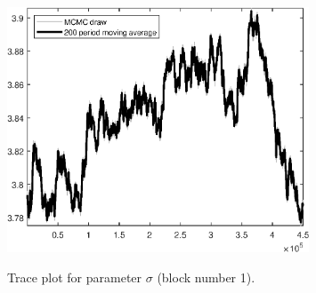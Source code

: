 \begin{figure}[H]
\centering
  \includegraphics[width=0.8\textwidth]{BRS_sectoral_wo_demand_shocks/graphs/TracePlot_sigma_blck_1}\\
    \caption{Trace plot for parameter ${\sigma}$ (block number 1).}
\end{figure}
